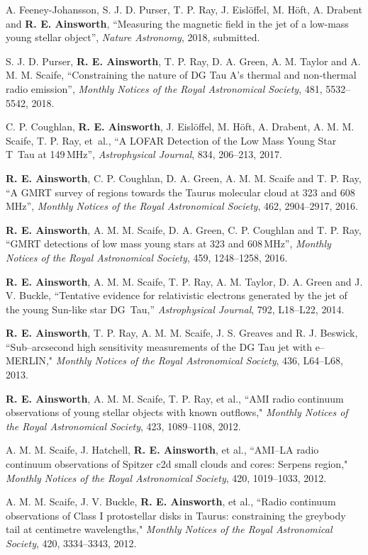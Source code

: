 \begin{cvpubs}
  \cvpub
    {
      \begin{cvetar}
      \item{A. Feeney-Johansson, S. J. D. Purser, T. P. Ray,  J. Eisl{\"o}ffel, M. H{\"o}ft, A. Drabent and \textbf{R. E. Ainsworth}, ``Measuring the magnetic field in the jet of a low-mass young stellar object'', \textit{Nature Astronomy}, 2018, submitted.}
       \item {S. J. D. Purser, \textbf{R. E. Ainsworth}, T. P. Ray, D. A. Green, A. M. Taylor and A. M. M. Scaife, ``Constraining the nature of DG Tau A's thermal and non-thermal radio emission'', \textit{Monthly Notices of the Royal Astronomical Society}, 481, 5532--5542, 2018.}
        \item {C. P. Coughlan, \textbf{R. E. Ainsworth}, J. Eisl{\"o}ffel, M. H{\"o}ft, A. Drabent, A. M. M. Scaife, T. P. Ray, et~al., ``A LOFAR Detection of the Low Mass Young Star T~Tau at 149\,MHz'', \textit{Astrophysical Journal}, 834, 206--213, 2017.}
        \item {\textbf{R. E. Ainsworth}, C. P. Coughlan, D. A. Green, A. M. M. Scaife and T. P. Ray, ``A GMRT survey of regions towards the Taurus molecular cloud at 323 and 608\,MHz'', \textit{Monthly Notices of the Royal Astronomical Society}, 462, 2904--2917, 2016.}
\item {\textbf{R. E. Ainsworth}, A. M. M. Scaife, D. A. Green, C. P. Coughlan and T. P. Ray, ``GMRT detections of low mass young stars at 323 and 608\,MHz'', \textit{Monthly Notices of the Royal Astronomical Society}, 459, 1248--1258, 2016.}
\item {\textbf{R. E. Ainsworth}, A. M. M. Scaife, T. P. Ray, A. M. Taylor, D. A. Green and J. V. Buckle, ``Tentative evidence for relativistic electrons generated by the jet of the young Sun-like star DG~Tau,'' \textit{Astrophysical Journal}, 792, L18--L22, 2014.}
\item {\textbf{R. E. Ainsworth}, T. P. Ray, A. M. M. Scaife, J. S. Greaves and R. J. Beswick, ``Sub--arcsecond high sensitivity measurements of the DG Tau jet with e--MERLIN," \textit{Monthly Notices of the Royal Astronomical Society}, 436, L64--L68, 2013.}
\item {\textbf{R. E. Ainsworth}, A. M. M. Scaife, T. P. Ray, et al., ``AMI radio continuum observations of young stellar objects with known outflows," \textit{Monthly Notices of the Royal Astronomical Society}, 423, 1089--1108, 2012.}
\item {A. M. M. Scaife, J. Hatchell, \textbf{R. E. Ainsworth}, et al., ``AMI--LA radio continuum observations of Spitzer c2d small clouds and cores: Serpens region," \textit{Monthly Notices of the Royal Astronomical Society}, 420, 1019--1033, 2012.}
\item {A. M. M. Scaife, J. V. Buckle, \textbf{R. E. Ainsworth}, et al., ``Radio continuum observations of Class I protostellar disks in Taurus: constraining the greybody tail at centimetre wavelengths," \textit{Monthly Notices of the Royal Astronomical Society}, 420, 3334--3343, 2012.}
      \end{cvetar}
    }
\end{cvpubs}

